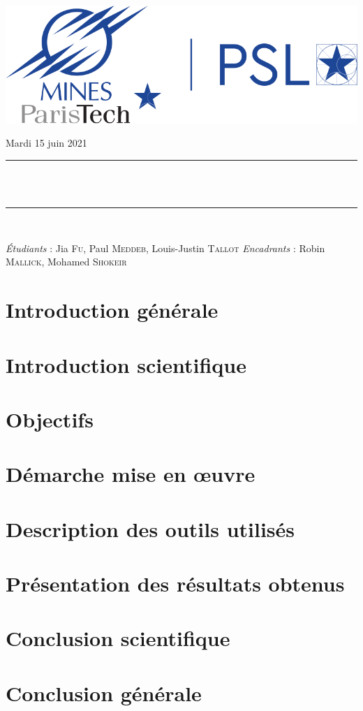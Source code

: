 \documentclass[12pt,oneside,oldfontcommands]{memoir}
\makeatletter
\def\maketitle{%
  \null
  \thispagestyle{empty}
  \begin{center}\leavevmode
       \vskip 2cm
       \normalfont
       \includegraphics[width=0.5\columnwidth]{logo_mines.png}
       \vskip 1cm
	     {\large Mardi 15 juin 2021\par}
       \vskip 1.0cm
	\rule{\linewidth}{0.2 mm} \\[0.4 cm]
	{ \huge \bfseries \@title}\\
	\rule{\linewidth}{0.2 mm} \\[1.5 cm]
	
	\vspace{1cm}
	
	\Large{\emph{Étudiants} : Jia \textsc{Fu}, Paul \textsc{Meddeb}, Louis-Justin \textsc{Tallot}}
	\vspace{0.5cm}
	\Large{\emph{Encadrants} : Robin \textsc{Mallick}, Mohamed \textsc{Shokeir}}
	
   \end{center}
   \vfill
   \null
   \cleardoublepage
  }
\makeatother
\begin{document}
\maketitle
\frontmatter
\let\cleardoublepage\clearpage
\mainmatter
\sloppy




\section*{Introduction générale}



\section*{Introduction scientifique}

\section*{Objectifs}

\section*{Démarche mise en œuvre}

\section*{Description des outils utilisés}

\section*{Présentation des résultats obtenus}

\section*{Conclusion scientifique}

\section*{Conclusion générale}
\end{document}
